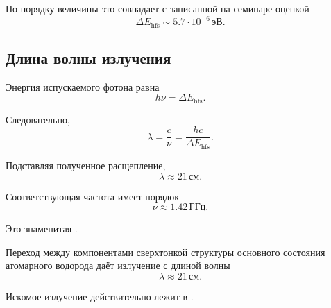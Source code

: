\documentclass[../final.tex]{subfiles}
\begin{document}
По порядку величины это совпадает с записанной на семинаре оценкой
%
\begin{equation*}
    \Delta E_{\mathrm{hfs}}
    \sim
    5.7\cdot10^{-6}\,\text{эВ}.
\end{equation*}



\subsection*{Длина волны излучения}

Энергия испускаемого фотона равна
%
\begin{equation*}
    h\nu
    =
    \Delta E_{\mathrm{hfs}}.
\end{equation*}

Следовательно,
%
\begin{equation*}
    \lambda
    =
    \frac{c}{\nu}
    =
    \frac{hc}{\Delta E_{\mathrm{hfs}}}.
\end{equation*}

Подставляя полученное расщепление,
%
\begin{equation*}
    \lambda
    \approx
    21\,\text{см}.
\end{equation*}

Соответствующая частота имеет порядок
%
\begin{equation*}
    \nu
    \approx
    1.42\,\text{ГГц}.
\end{equation*}

Это знаменитая .



\answer

Переход между компонентами сверхтонкой структуры основного состояния
атомарного водорода даёт излучение с длиной волны
%
\begin{equation*}
    \lambda
    \approx
    21\,\text{см}.
\end{equation*}

Искомое излучение действительно лежит в .


\end{document}
